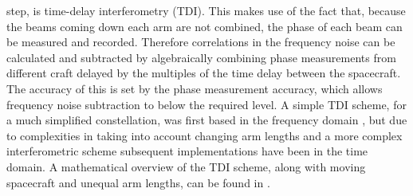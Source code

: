 \documentclass{article}
\begin{document}
step, is time-delay interferometry (TDI). This makes use of the fact that,
because the beams coming down each arm are not combined, the phase of each beam can
be measured and recorded. Therefore correlations in the frequency noise can be
calculated and subtracted by algebraically combining phase measurements from
different craft delayed by the multiples of the time delay between the spacecraft.
The accuracy of this is set by the phase measurement accuracy, which allows
frequency noise subtraction to below the required level. A simple TDI scheme,
for a much simplified constellation, was first based in the frequency domain
\cite{Giampieri}, but due to complexities in taking into account changing arm
lengths and a more complex interferometric scheme subsequent implementations have
been in the time domain. A mathematical overview of the TDI scheme, along with
moving spacecraft and unequal arm lengths, can be found in \cite{Tinto:2005}.
\end{document}
